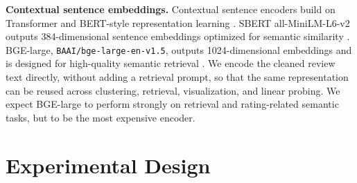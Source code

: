\documentclass{article}
\newcommand{\code}[1]{\texttt{#1}}
\begin{document}
\textbf{Contextual sentence embeddings.} Contextual sentence encoders build on Transformer and BERT-style representation learning \cite{vaswani2017,devlin2019}. SBERT all-MiniLM-L6-v2 outputs 384-dimensional sentence embeddings optimized for semantic similarity \cite{reimers2019,wang2020minilm}. BGE-large, \code{BAAI/bge-large-en-v1.5}, outputs 1024-dimensional embeddings and is designed for high-quality semantic retrieval \cite{xiao2023}. We encode the cleaned review text directly, without adding a retrieval prompt, so that the same representation can be reused across clustering, retrieval, visualization, and linear probing. We expect BGE-large to perform strongly on retrieval and rating-related semantic tasks, but to be the most expensive encoder.

\section{Experimental Design}
\end{document}
